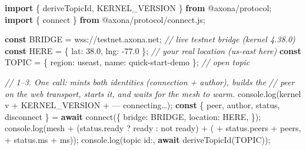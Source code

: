 \documentclass[
  nobib]{tufte-handout}
\newenvironment{Shaded}{}{}
\newcommand{\AttributeTok}[1]{\textcolor[rgb]{0.49,0.56,0.16}{#1}}
\newcommand{\BuiltInTok}[1]{\textcolor[rgb]{0.00,0.50,0.00}{#1}}
\newcommand{\CommentTok}[1]{\textcolor[rgb]{0.38,0.63,0.69}{\textit{#1}}}
\newcommand{\ControlFlowTok}[1]{\textcolor[rgb]{0.00,0.44,0.13}{\textbf{#1}}}
\newcommand{\DataTypeTok}[1]{\textcolor[rgb]{0.56,0.13,0.00}{#1}}
\newcommand{\FloatTok}[1]{\textcolor[rgb]{0.25,0.63,0.44}{#1}}
\newcommand{\FunctionTok}[1]{\textcolor[rgb]{0.02,0.16,0.49}{#1}}
\newcommand{\ImportTok}[1]{\textcolor[rgb]{0.00,0.50,0.00}{\textbf{#1}}}
\newcommand{\KeywordTok}[1]{\textcolor[rgb]{0.00,0.44,0.13}{\textbf{#1}}}
\newcommand{\NormalTok}[1]{#1}
\newcommand{\OperatorTok}[1]{\textcolor[rgb]{0.40,0.40,0.40}{#1}}
\newcommand{\StringTok}[1]{\textcolor[rgb]{0.25,0.44,0.63}{#1}}
\begin{document}
\begin{Shaded}
\begin{Highlighting}[]
\ImportTok{import}\NormalTok{ \{ deriveTopicId}\OperatorTok{,}\NormalTok{ KERNEL\_VERSION \} }\ImportTok{from} \StringTok{\textquotesingle{}@axona/protocol\textquotesingle{}}\OperatorTok{;}
\ImportTok{import}\NormalTok{ \{ connect \} }\ImportTok{from} \StringTok{\textquotesingle{}@axona/protocol/connect.js\textquotesingle{}}\OperatorTok{;}

\KeywordTok{const}\NormalTok{ BRIDGE }\OperatorTok{=} \StringTok{\textquotesingle{}wss://testnet.axona.net\textquotesingle{}}\OperatorTok{;}           \CommentTok{// live testnet bridge (kernel 4.38.0)}
\KeywordTok{const}\NormalTok{ HERE   }\OperatorTok{=}\NormalTok{ \{ }\DataTypeTok{lat}\OperatorTok{:} \FloatTok{38.0}\OperatorTok{,} \DataTypeTok{lng}\OperatorTok{:} \OperatorTok{{-}}\FloatTok{77.0}\NormalTok{ \}}\OperatorTok{;}           \CommentTok{// your real location (us{-}east here)}
\KeywordTok{const}\NormalTok{ TOPIC  }\OperatorTok{=}\NormalTok{ \{ }\DataTypeTok{region}\OperatorTok{:} \StringTok{\textquotesingle{}useast\textquotesingle{}}\OperatorTok{,} \DataTypeTok{name}\OperatorTok{:} \StringTok{\textquotesingle{}quick{-}start{-}demo\textquotesingle{}}\NormalTok{ \}}\OperatorTok{;}   \CommentTok{// open topic}

\CommentTok{// 1–3. One call: mints both identities (connection + author), builds the}
\CommentTok{//      peer on the web transport, starts it, and waits for the mesh to warm.}
\BuiltInTok{console}\OperatorTok{.}\FunctionTok{log}\NormalTok{(}\StringTok{\textquotesingle{}kernel v\textquotesingle{}} \OperatorTok{+}\NormalTok{ KERNEL\_VERSION }\OperatorTok{+} \StringTok{\textquotesingle{} — connecting…\textquotesingle{}}\NormalTok{)}\OperatorTok{;}
\KeywordTok{const}\NormalTok{ \{ peer}\OperatorTok{,}\NormalTok{ author}\OperatorTok{,}\NormalTok{ status}\OperatorTok{,}\NormalTok{ disconnect \} }\OperatorTok{=} \ControlFlowTok{await} \FunctionTok{connect}\NormalTok{(\{}
  \DataTypeTok{bridge}\OperatorTok{:}\NormalTok{   BRIDGE}\OperatorTok{,}
  \DataTypeTok{location}\OperatorTok{:}\NormalTok{ HERE}\OperatorTok{,}
\NormalTok{\})}\OperatorTok{;}
\BuiltInTok{console}\OperatorTok{.}\FunctionTok{log}\NormalTok{(}\StringTok{\textquotesingle{}mesh \textquotesingle{}} \OperatorTok{+}\NormalTok{ (status}\OperatorTok{.}\AttributeTok{ready} \OperatorTok{?} \StringTok{\textquotesingle{}ready\textquotesingle{}} \OperatorTok{:} \StringTok{\textquotesingle{}not ready\textquotesingle{}}\NormalTok{) }\OperatorTok{+} \StringTok{\textquotesingle{} (\textquotesingle{}} \OperatorTok{+}\NormalTok{ status}\OperatorTok{.}\AttributeTok{peers} \OperatorTok{+} \StringTok{\textquotesingle{} peers, \textquotesingle{}} \OperatorTok{+}\NormalTok{ status}\OperatorTok{.}\AttributeTok{ms} \OperatorTok{+} \StringTok{\textquotesingle{}ms)\textquotesingle{}}\NormalTok{)}\OperatorTok{;}
\BuiltInTok{console}\OperatorTok{.}\FunctionTok{log}\NormalTok{(}\StringTok{\textquotesingle{}topic id:\textquotesingle{}}\OperatorTok{,} \ControlFlowTok{await} \FunctionTok{deriveTopicId}\NormalTok{(TOPIC))}\OperatorTok{;}


\end{Highlighting}
\end{Shaded}
\end{document}
